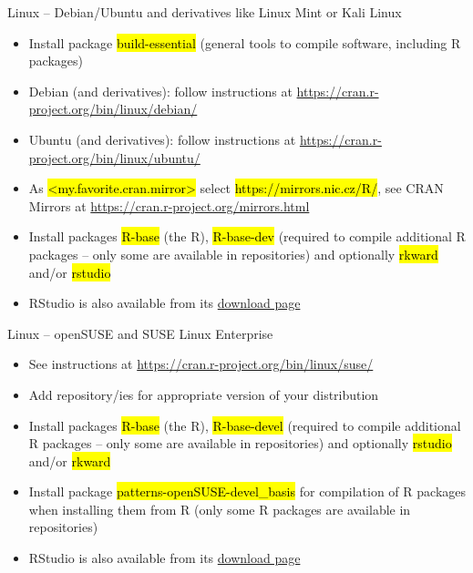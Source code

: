 \documentclass[compress, ucs, xelatex, 11pt, xcolor=svgnames,
  hyperref={
    bookmarks=true,
    unicode=true,
    colorlinks=true,
    pdftitle={Molecular data in R},
    plainpages=false,
    pdfauthor={Vojtech Zeisek},
    pdfsubject={Course about phylogeny and evolution in R},
    pdfcreator={XeLaTeX},
    pdfkeywords={R, evolution, phylogeny, molecular data},
    linkcolor=Tomato,
    anchorcolor=SaddleBrown,
    citecolor=Goldenrod,
    filecolor=DarkMagenta,
    menucolor=Sienna,
    urlcolor=DarkTurquoise,
    pdftex},
  url={hyphens, lowtilde} %
  ]{beamer}
\renewcommand{\texttt}[1]{\hl{\ttfamily #1}}
\begin{document}
\begin{frame}{Linux -- Debian/Ubuntu and derivatives like Linux Mint or Kali Linux}
  \begin{itemize}
    \item Install package \texttt{build-essential} (general tools to compile software, including R packages)
    \item Debian (and derivatives): follow instructions at \url{https://cran.r-project.org/bin/linux/debian/}
    \item Ubuntu (and derivatives): follow instructions at \url{https://cran.r-project.org/bin/linux/ubuntu/}
    \item As \texttt{<my.favorite.cran.mirror>} select \alert{\texttt{https://mirrors.nic.cz/R/}}, see \alert{CRAN Mirrors} at \url{https://cran.r-project.org/mirrors.html}
    \item Install packages \texttt{R-base} (the R), \texttt{R-base-dev} (required to compile additional R packages -- only some are available in repositories) and optionally \texttt{rkward} and/or \texttt{rstudio}
    \item RStudio is also available from its \href{https://www.rstudio.com/products/rstudio/download/\#download}{download page}
  \end{itemize}
\end{frame}

\begin{frame}{Linux -- openSUSE and SUSE Linux Enterprise}
  \begin{itemize}
    \item See instructions at \url{https://cran.r-project.org/bin/linux/suse/}
    \item Add repository/ies for appropriate version of your distribution
    \begin{itemize}
    \end{itemize}
    \item Install packages \texttt{R-base} (the R), \texttt{R-base-devel} (required to compile additional R packages -- only some are available in repositories) and optionally \texttt{rstudio} and/or \texttt{rkward}
    \item Install package \texttt{patterns-openSUSE-devel\_basis} for compilation of R packages when installing them from R (only some R packages are available in repositories)
    \item RStudio is also available from its \href{https://www.rstudio.com/products/rstudio/download/\#download}{download page}
  \end{itemize}
\end{frame}
\end{document}
